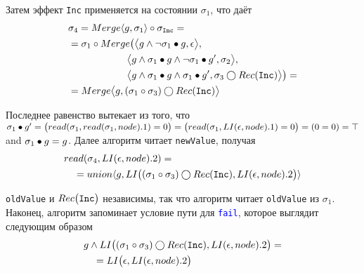 \begin{exmp}
Затем эффект \texttt{Inc} применяется на состоянии $\sigma_1$, что даёт
\begin{align*}
&\sigma_4 = Merge{\langle g, \sigma_1\rangle}\circ\sigma_{\texttt{Inc}}=\\
&=\sigma_1\circ Merge\big(\big\langle g\wedge\neg \sigma_1\bullet g, \epsilon\big\rangle,\\ &\qquad\qquad\qquad\big\langle g\wedge\sigma_1\bullet g \wedge \neg \sigma_1\bullet g', \sigma_2\big\rangle,\\
&\qquad\qquad\qquad\big\langle g\wedge\sigma_1\bullet g\wedge \sigma_1\bullet g', \sigma_3\bigcirc Rec(\texttt{Inc})\big\rangle\big)=\\
&=Merge{\big\langle g, (\sigma_1\circ\sigma_3)\bigcirc Rec(\texttt{Inc})\big\rangle}
\end{align*}

Последнее равенство вытекает из того, что $\sigma_1\bullet g'=\big(read(\sigma_1,read(\sigma_1,node).1) = 0\big) = \big(read(\sigma_1,LI(\epsilon, node).1) = 0\big) = (0 = 0) = \top$ and $\sigma_1\bullet g = g$. Далее алгоритм читает \texttt{newValue}, получая
\begin{align*}
&read(\sigma_4,LI(\epsilon, node).2)=\\
&\quad=union{\langle g, LI\big((\sigma_1\circ\sigma_3)\bigcirc Rec(\texttt{Inc}), LI(\epsilon, node).2\big)\rangle}
\end{align*}

\texttt{oldValue} и $Rec\big(\texttt{Inc}\big)$ независимы, так что алгоритм читает \texttt{oldValue} из $\sigma_1$. Наконец, алгоритм запоминает условие пути для \texttt{\textcolor{blue}{fail}}, которое выглядит следующим образом
\begin{align}\label{exmp:fail-pc}
&g \wedge LI\big((\sigma_1\circ\sigma_3)\bigcirc Rec(\texttt{Inc}), LI(\epsilon, node).2\big)=\\\notag
&\quad=LI\big(\epsilon, LI(\epsilon, node).2\big)
\end{align}
\end{exmp}


